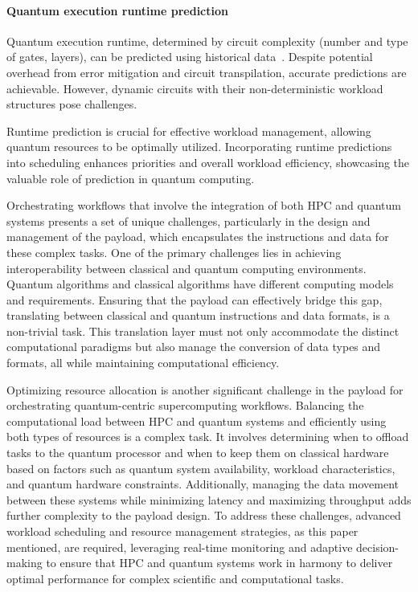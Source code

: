 \paragraph{Quantum execution runtime prediction}

Quantum execution runtime, determined by circuit complexity (number and type of gates, layers), can be predicted using historical data~\cite{ravi2022adaptive}. Despite potential overhead from error mitigation and circuit transpilation, accurate predictions are achievable. However, dynamic circuits with their non-deterministic workload structures pose challenges. 

Runtime prediction is crucial for effective workload management, allowing quantum resources to be optimally utilized. Incorporating runtime predictions into scheduling enhances priorities and overall workload efficiency, showcasing the valuable role of prediction in quantum computing.



Orchestrating workflows that involve the integration of both HPC and quantum systems presents a set of unique challenges, particularly in the design and management of the payload, which encapsulates the instructions and data for these complex tasks. One of the primary challenges lies in achieving interoperability between classical and quantum computing environments. Quantum algorithms and classical algorithms have different computing models and requirements. Ensuring that the payload can effectively bridge this gap, translating between classical and quantum instructions and data formats, is a non-trivial task. This translation layer must not only accommodate the distinct computational paradigms but also manage the conversion of data types and formats, all while maintaining computational efficiency.



Optimizing resource allocation is another significant challenge in the payload for orchestrating quantum-centric supercomputing workflows. Balancing the computational load between HPC and quantum systems and efficiently using both types of resources is a complex task. It involves determining when to offload tasks to the quantum processor and when to keep them on classical hardware based on factors such as quantum system availability, workload characteristics, and quantum hardware constraints. Additionally, managing the data movement between these systems while minimizing latency and maximizing throughput adds further complexity to the payload design. To address these challenges, advanced workload scheduling and resource management strategies, as this paper mentioned, are required, leveraging real-time monitoring and adaptive decision-making to ensure that HPC and quantum systems work in harmony to deliver optimal performance for complex scientific and computational tasks.


